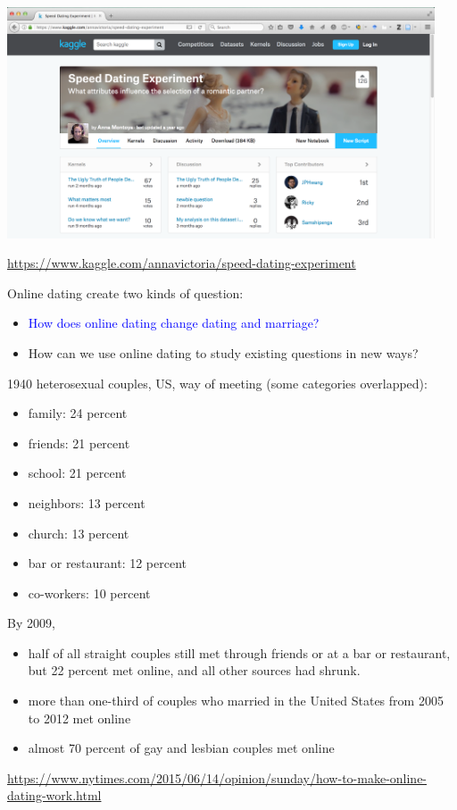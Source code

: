\documentclass[aspectratio=169]{beamer}
\begin{document}
\begin{frame}

\begin{center}
\includegraphics[width=0.95\textwidth]{figures/kaggle_speed_dating}
\end{center}

\url{https://www.kaggle.com/annavictoria/speed-dating-experiment}
\end{frame}
\begin{frame}

Online dating create two kinds of question:
\begin{itemize}
\item \textcolor{blue}{How does online dating change dating and marriage?}
\item How can we use online dating to study existing questions in new ways?
\end{itemize}

\end{frame}
\begin{frame}

1940 heterosexual couples, US, way of meeting (some categories overlapped):
\begin{itemize}
\item family: 24 percent 
\item friends: 21 percent
\item school: 21 percent 
\item neighbors: 13 percent 
\item church: 13 percent
\item bar or restaurant: 12 percent 
\item co-workers: 10 percent 
\end{itemize}

\pause

By 2009, 
\begin{itemize}
\item half of all straight couples still met through friends or at a bar or restaurant, but 22 percent met online, and all other sources had shrunk. \pause
\item more than one-third of couples who married in the United States from 2005 to 2012 met online \pause
\item almost 70 percent of gay and lesbian couples met online
\end{itemize}

\vfill
\tiny{\url{https://www.nytimes.com/2015/06/14/opinion/sunday/how-to-make-online-dating-work.html}}

\end{frame}
\end{document}
